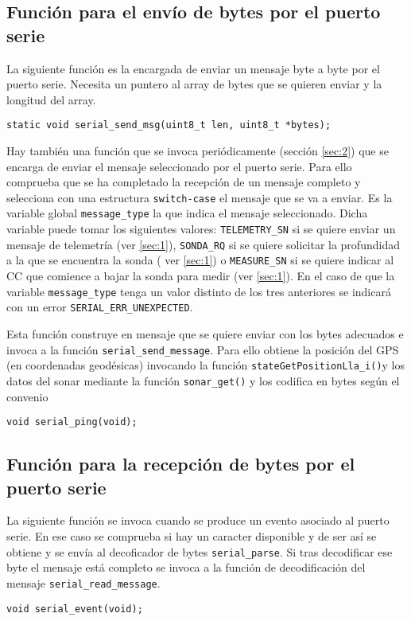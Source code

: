 \subsection{Función para el envío de bytes por el puerto serie}

La siguiente función es la encargada de enviar un mensaje byte a byte por el puerto serie. Necesita un puntero al array de bytes que se quieren enviar y la longitud del array.
\begin{lstlisting}[style=C]
static void serial_send_msg(uint8_t len, uint8_t *bytes);
\end{lstlisting}

Hay también una función que se invoca periódicamente (sección \ref{sec:2}) que se encarga de enviar el mensaje seleccionado por el puerto serie. Para ello comprueba que se ha completado la recepción de un mensaje completo y selecciona con una estructura \texttt{switch-case} el mensaje que se va a enviar. Es la variable global \texttt{message\_type} la que indica el mensaje seleccionado. Dicha variable puede tomar los siguientes valores: \texttt{TELEMETRY\_SN} si se quiere enviar un mensaje de telemetría (ver \ref{sec:1}), \texttt{SONDA\_RQ} si se quiere solicitar la profundidad a la que se encuentra la sonda ( ver \ref{sec:1}) o \texttt{MEASURE\_SN} si se quiere indicar al CC que comience a bajar la sonda para medir (ver \ref{sec:1}). En el caso de que la variable \texttt{message\_type} tenga un valor distinto de los tres anteriores se indicará con un error \texttt{SERIAL\_ERR\_UNEXPECTED}. 

Esta función construye en mensaje que se quiere enviar con los bytes adecuados e invoca a la función \texttt{serial\_send\_message}. Para ello obtiene la posición del GPS  (en coordenadas geodésicas) invocando la función \texttt{stateGetPositionLla\_i()}y los datos del sonar mediante la función \texttt{sonar\_get()} y los codifica en bytes según el convenio

\begin{lstlisting}[style=C]
void serial_ping(void);
\end{lstlisting}


\subsection{Función para la recepción de bytes por el puerto serie}

La siguiente función se invoca cuando se produce un evento asociado al puerto serie. En ese caso se comprueba si hay un caracter disponible y de ser así se obtiene y se envía al decoficador de bytes \texttt{serial\_parse}. Si tras decodificar ese byte el mensaje está completo se invoca a la función de decodificación del mensaje \texttt{serial\_read\_message}.
 \begin{lstlisting}[style=C]
 void serial_event(void);
 \end{lstlisting}
 
